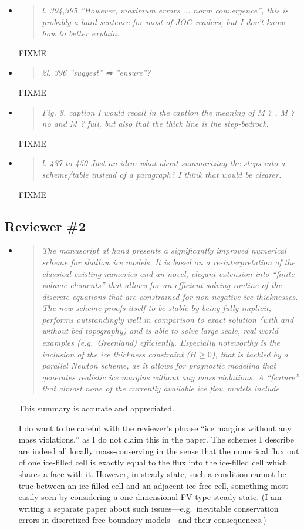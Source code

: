 \documentclass[11pt,reqno]{amsart}
\newcommand{\reply}[2]{
\medskip\medskip
\item  \begin{quote}
\emph{#1}
\end{quote}

\medskip
\noindent #2}
\begin{document}
\begin{itemize}
\reply{l. 394,395 ”However, maximum errors ... norm convergence”, this is probably a hard sentence for most of JOG readers, but I don’t know how to better explain.}
{FIXME}

\reply{2l. 396 ”suggest” ⇒ ”ensure”?}
{FIXME}

\reply{Fig. 8, caption I would recall in the caption the meaning of M ? , M ? no and M ? full, but also that
the thick line is the step-bedrock.}
{FIXME}

\reply{l. 437 to 450 Just an idea: what about summarizing the steps into a scheme/table instead of
a paragraph? I think that would be clearer.}
{FIXME}

\end{itemize}


\subsection*{Reviewer \#2}  \begin{itemize}
\reply{The manuscript at hand presents a significantly improved numerical scheme for shallow ice models. It is based on a re-interpretation of the classical existing numerics and an novel, elegant extension into ``finite volume elements'' that allows for an efficient solving routine of the discrete equations that are constrained for non-negative ice thicknesses. The new scheme proofs itself to be stable by being fully implicit, performs outstandingly well in comparison to exact solution (with and without bed topography) and is able to solve large scale, real world examples (e.g.~Greenland) efficiently. Especially noteworthy is the inclusion of the ice thickness constraint ($H\ge 0$), that is tackled by a parallel Newton scheme, as it allows for prognostic modeling that generates realistic ice margins without any mass violations.  A ``feature'' that almost none of the currently available ice flow models include.}
{This summary is accurate and appreciated.

I do want to be careful with the reviewer's phrase ``ice margins without any mass violations,'' as I do not claim this in the paper.  The schemes I describe are indeed all locally mass-conserving in the sense that the numerical flux out of one ice-filled cell is exactly equal to the flux into the ice-filled cell which shares a face with it.  However, in steady state, such a condition cannot be true between an ice-filled cell and an adjacent ice-free cell, something most easily seen by considering a one-dimensional FV-type steady state.  (I am writing a separate paper about such issues---e.g.~inevitable conservation errors in discretized free-boundary models---and their consequences.)

}
\end{itemize}
\end{document}
